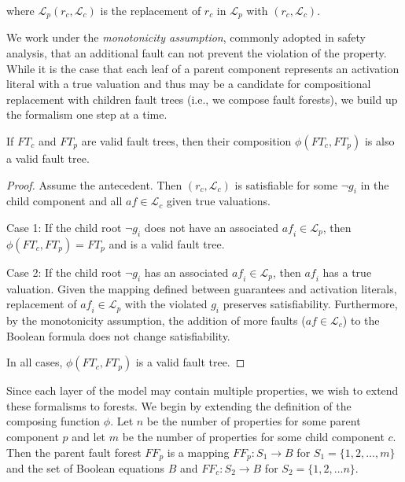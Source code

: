 where $\mathcal{L}_p(r_c, \mathcal{L}_c)$ is the replacement of $r_c$ in $\mathcal{L}_p$ with $(r_c, \mathcal{L}_c)$.

We work under the {\em monotonicity assumption}, commonly adopted in safety analysis, that an additional fault can not prevent the violation of the property. While it is the case that each leaf of a parent component represents an activation literal with a true valuation and thus may be a candidate for compositional replacement with children fault trees (i.e., we compose fault forests), we build up the formalism one step at a time. 

\begin{lemma} If $\mathit{FT}_c$ and $\mathit{FT}_p$ are valid fault trees, then their composition $\phi(\mathit{FT}_c, \mathit{FT}_p)$ is also a valid fault tree. 
\begin{proof}
Assume the antecedent. Then $(r_c, \mathcal{L}_c)$ is satisfiable for some $\neg g_i$ in the child component and all $\mathit{af} \in \mathcal{L}_c$ given true valuations. 

Case 1: If the child root $\neg g_i$ does not have an associated $\mathit{af}_i \in \mathcal{L}_p$, then $\phi(\mathit{FT}_c, \mathit{FT}_p) = \mathit{FT}_p$ and is a valid fault tree.

Case 2: If the child root $\neg g_i$ has an associated $\mathit{af}_i \in \mathcal{L}_p$, then $\mathit{af}_i$ has a true valuation. Given the mapping defined between guarantees and activation literals, replacement of $\mathit{af}_i \in \mathcal{L}_p$ with the violated $g_i$ preserves satisfiability. Furthermore, by the monotonicity assumption, the addition of more faults ($\mathit{af} \in \mathcal{L}_c$) to the Boolean formula does not change satisfiability. 

In all cases, $\phi(\mathit{FT}_c, \mathit{FT}_p)$ is a valid fault tree. 
\end{proof}
\label{lemma:validTree}
\end{lemma}

Since each layer of the model may contain multiple properties, we wish to extend these formalisms to forests. We begin by extending the definition of the composing function $\phi$. Let $n$ be the number of properties for some parent component $p$ and let $m$ be the number of properties for some child component $c$. Then the parent fault forest $\mathit{FF}_p$ is a mapping $\mathit{FF}_p : S_1 \rightarrow B$ for $S_1 = \{1,2,\dots,m\}$ and the set of Boolean equations $B$ and $\mathit{FF}_c: S_2 \rightarrow B$ for $S_2 = \{1,2,\dots n\}$. 

